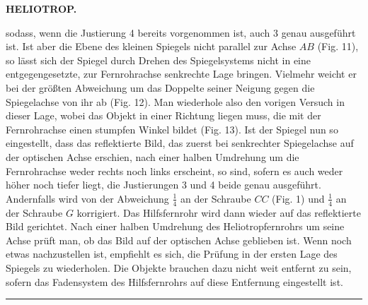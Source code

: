 \par\clearpage
\noindent{}\hfill{\small\textbf{HELIOTROP.}}\hfill\null\par\medskip
\noindent sodass, wenn die Justierung 4 bereits vorgenommen ist, auch 3 genau ausgeführt ist. Ist aber die Ebene des kleinen Spiegels nicht parallel zur Achse $AB$ (Fig. 11), so lässt sich der Spiegel durch Drehen des Spiegelsystems nicht in eine entgegengesetzte, zur Fernrohrachse senkrechte Lage bringen. Vielmehr weicht er bei der größten Abweichung um das Doppelte seiner Neigung gegen die Spiegelachse von ihr ab (Fig. 12). Man wiederhole also den vorigen Versuch in dieser Lage, wobei das Objekt in einer Richtung liegen muss, die mit der Fernrohrachse einen stumpfen Winkel bildet (Fig. 13). Ist der Spiegel nun so eingestellt, dass das reflektierte Bild, das zuerst bei senkrechter Spiegelachse auf der optischen Achse erschien, nach einer halben Umdrehung um die Fernrohrachse weder rechts noch links erscheint, so sind, sofern es auch weder höher noch tiefer liegt, die Justierungen 3 und 4 beide genau ausgeführt. Andernfalls wird von der Abweichung $\frac14$ an der Schraube $CC$ (Fig. 1) und $\frac14$ an der Schraube $G$ korrigiert. Das Hilfsfernrohr wird dann wieder auf das reflektierte Bild gerichtet. Nach einer halben Umdrehung des Heliotropfernrohrs um seine Achse prüft man, ob das Bild auf der optischen Achse geblieben ist. Wenn noch etwas nachzustellen ist, empfiehlt es sich, die Prüfung in der ersten Lage des Spiegels zu wiederholen. Die Objekte brauchen dazu nicht weit entfernt zu sein, sofern das Fadensystem des Hilfsfernrohrs auf diese Entfernung eingestellt ist.
\par\vspace{2.5cm}\begin{center}\rule{3.5cm}{.4pt}\end{center}

